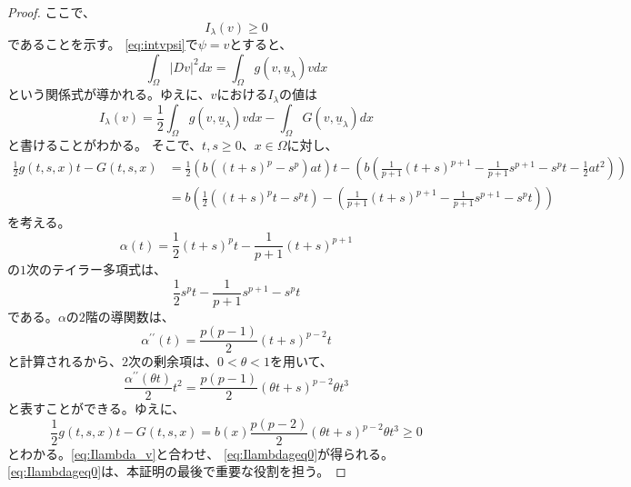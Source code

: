 \begin{proof}
 ここで、
 \begin{equation}
  I_\lambda(v) \geq 0 \label{eq:Ilambdageq0}
 \end{equation}
 であることを示す。
 \eqref{eq:intvpsi}で$\psi = v$とすると、
 \begin{equation}
  \int_\Omega \lvert Dv \rvert^2 dx = \int_\Omega g(v,
   \underline{u}_\lambda)v dx \label{eq:v_kankei}
 \end{equation}
 という関係式が導かれる。ゆえに、$v$における$I_\lambda$の値は
 \begin{equation}
  I_\lambda (v) = \frac{1}{2} \int_\Omega g(v, \underline{u}_\lambda)
   v dx - \int_\Omega G(v, \underline{u}_\lambda) dx \label{eq:Ilambda_v}
 \end{equation}
 と書けることがわかる。
 そこで、$t, s \geq 0$、$x \in \Omega$に対し、
 \begin{align*}
  \frac{1}{2} g(t, s, x) t - G(t, s, x) &= \frac{1}{2} \left(b \left(
  (t+s)^p - s^p \right) at \right)t - \left( b \left(
  \frac{1}{p+1}(t+s)^{p+1} - \frac{1}{p+1}s^{p+1} - s^p t -
  \frac{1}{2}at^2  \right) \right) \\
  &= b \left( \frac{1}{2} \left( (t+s)^pt - s^pt \right) -\left(
  \frac{1}{p+1} (t+s)^{p+1} - \frac{1}{p+1} s^{p+1} - s^p t \right) \right)
 \end{align*}
 を考える。
 \[
  \alpha(t) = \frac{1}{2} (t+s)^p t - \frac{1}{p+1}(t+s)^{p+1}
 \]
 の$1$次のテイラー多項式は、
 \[
  \frac{1}{2} s^p t - \frac{1}{p+1}s^{p+1} - s^p t
 \]
 である。$\alpha$の$2$階の導関数は、
 \[
  \alpha^{\prime\prime}(t) = \frac{p(p-1)}{2}(t+s)^{p-2}t
 \]
 と計算されるから、$2$次の剰余項は、$0 < \theta < 1$を用いて、
 \[
  \frac{\alpha^{\prime\prime}(\theta t)}{2} t^2 =
 \frac{p(p-1)}{2}(\theta t + s)^{p-2} \theta t^3
 \]
 と表すことができる。ゆえに、
 \[
  \frac{1}{2} g(t, s, x)t - G(t, s, x) = b(x) \frac{p(p-2)}{2} (\theta
 t + s)^{p-2} \theta t^3 \geq 0
 \]
 とわかる。\eqref{eq:Ilambda_v}と合わせ、
 \eqref{eq:Ilambdageq0}が得られる。
 \eqref{eq:Ilambdageq0}は、本証明の最後で重要な役割を担う。


\end{proof}
